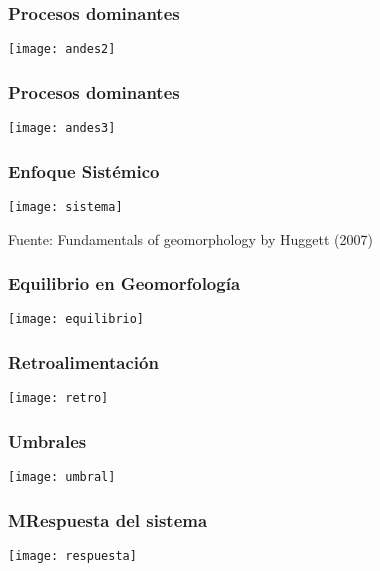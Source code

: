 \documentclass{beamer}
\begin{document}
\begin{frame}
\frametitle{Procesos dominantes}
\begin{center}
\texttt{[image: andes2]}
\end{center}
\tiny{}
\end{frame}
\begin{frame}
\frametitle{Procesos dominantes}
\begin{center}
\texttt{[image: andes3]}
\end{center}
\tiny{}
\end{frame}
\begin{frame}
\frametitle{Enfoque Sistémico}
\begin{center}
\texttt{[image: sistema]}
\end{center}
\tiny{Fuente: Fundamentals of geomorphology by Huggett (2007)}
\end{frame}
\begin{frame}
\frametitle{Equilibrio en Geomorfología}
\begin{center}
\texttt{[image: equilibrio]}
\end{center}
\end{frame}
\begin{frame}
\frametitle{Retroalimentación}
\begin{center}
\texttt{[image: retro]}
\end{center}
\end{frame}
\begin{frame}
\frametitle{Umbrales}
\begin{center}
\texttt{[image: umbral]}
\end{center}
\end{frame}
\begin{frame}
\frametitle{MRespuesta del sistema}
\begin{center}
\texttt{[image: respuesta]}
\end{center}
\end{frame}
\end{document}
